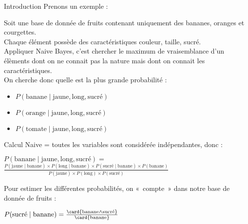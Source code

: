 \begin{frame}{Introduction}
  \def\banane{\text{banane}}%
  \def\orange{\text{orange}}%
  \def\tomate{\text{tomate}}%
  \def\jaune{\text{jaune}}%
  \def\longg{\text{long}}%
  \def\sucre{\text{sucré}}%
  Prenons un exemple :

  Soit une base de donnée de fruits contenant uniquement des bananes, oranges et courgettes. \\
  Chaque élément possède des caractéristiques couleur, taille, sucré. \\
  Appliquer Naive Bayes, c'est chercher le maximum de vraisemblance d'un élèments dont on ne connait pas la nature mais dont on connait les caractéristiques. \\
  On cherche donc quelle est la plus grande probabilité :
  \begin{itemize}
  \item $P(\banane \mid \jaune, \longg, \sucre)$
  \item $P(\orange \mid \jaune, \longg, \sucre)$
  \item $P(\tomate \mid \jaune, \longg, \sucre)$
  \end{itemize}
\end{frame}

\begin{frame}{Calcul}
  \def\banane{\text{banane}}%
  \def\orange{\text{orange}}%
  \def\tomate{\text{tomate}}%
  \def\jaune{\text{jaune}}%
  \def\longg{\text{long}}%
  \def\sucre{\text{sucré}}%
  Naive = toutes les variables sont considérée indépendantes, donc : \\
  \begin{center}
    $P(\banane \mid \jaune, \longg, \sucre) =$\\
    $\;$\\
    $ \frac{P(\jaune \mid \banane) \times P(\longg \mid \banane) \times P(\sucre \mid \banane) \times P(\banane)}%
    {P(\jaune) \times P(\longg) \times P(\sucre)}$
  \end{center}
  Pour estimer les différentes probabilités, on «~compte~» dans notre base de donnée de fruits :\\
  \begin{center}
    $P(\sucre \mid \banane) = \frac{\card{\banane \land \sucre}}{\card{\banane}}$
  \end{center}
\end{frame}
